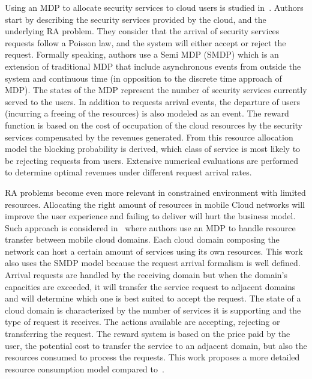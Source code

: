 Using an MDP to allocate security services to cloud users is studied in~\cite{Liang2011}.
Authors start by describing the security services provided by the cloud, and the underlying RA problem.
They consider that the arrival of security services requests follow a Poisson law, and the system will either accept or reject the request. Formally speaking, authors use a Semi MDP (SMDP) which is an extension of traditional MDP that include asynchronous events from outside the system and continuous time (in opposition to the discrete time approach of MDP).
The states of the MDP represent the number of security services currently served to the users. In addition to requests arrival events, the departure of users (incurring a freeing of the resources) is also modeled as an event. The reward function is based on the cost of occupation of the cloud resources by the security services compensated by the revenues generated. 
From this resource allocation model the blocking probability is derived, \ie which class of service is most likely to be rejecting requests from users. Extensive numerical evaluations are performed to determine optimal revenues under different request arrival rates.

RA problems become even more relevant in constrained environment with limited resources.
Allocating the right amount of resources in mobile Cloud networks will improve the user experience and failing to deliver will hurt the business model.
Such approach is considered in~\cite{Liang2012} where authors use an MDP to handle resource transfer between mobile cloud domains. Each cloud domain composing the network can host a certain amount of services using its own resources. 
This work also uses the SMDP model because the request arrival formalism is well defined.
Arrival requests are handled by the receiving domain but when the domain's capacities are exceeded, it will transfer the service request to adjacent domains and will determine which one is best suited to accept the request.
The state of a cloud domain is characterized by the number of services it is supporting and the type of request it receives.
The actions available are accepting, rejecting or transferring the request.
The reward system is based on the price paid by the user, the potential cost to transfer the service to an adjacent domain, but also the resources consumed to process the requests. 
This work proposes a more detailed resource consumption model compared to~\cite{Liang2011}.

